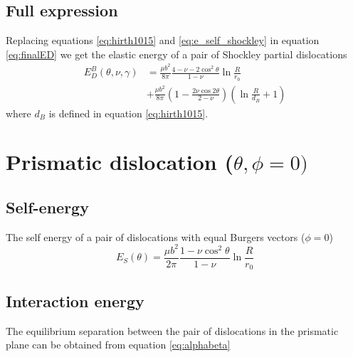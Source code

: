 \documentclass[10pt,a4paper,draft]{article}
\begin{document}
\subsection{Full expression}
Replacing equations \ref{eq:hirth1015} and \ref{eq:e_self_shockley} in equation \ref{eq:finalED} we get the elastic energy of a pair of Shockley partial dislocations
\begin{equation}
\begin{split}
E_D^B(\theta,\nu,\gamma) &= \frac{\mu b^2}{8\pi}\frac{4-\nu-2\cos^2\theta}{1-\nu}\ln\frac{R}{r_0} \\ 
&+\frac{\mu b^2}{8\pi}\left(1-\frac{2\nu\cos2\theta}{2-\nu}\right)\left(\ln\frac{R}{d_B} + 1 \right)
\end{split}
\label{eq:EDshoc}
\end{equation}
where $d_B$ is defined in equation \ref{eq:hirth1015}.

\section{Prismatic dislocation ($\theta, \phi= 0)$}
\subsection{Self-energy}
The self energy of a pair of dislocations with equal Burgers vectors ($\phi=0$)
\begin{equation}
E_S(\theta) = \frac{\mu b^2}{2\pi}\frac{1-\nu\cos^2\theta}{1-\nu}\ln\frac{R}{r_0} \label{eq:selfprism}
\end{equation}

\subsection{Interaction energy}
The equilibrium separation between the pair of dislocations in the prismatic plane can be obtained from equation \ref{eq:alphabeta}
\end{document}
